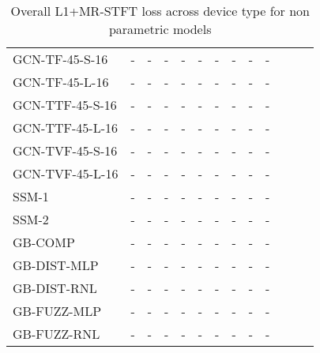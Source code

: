 \begin{table*}[h]
\begin{tabular}{lcccccccccccc}
        \midrule
        GCN-TF-45-S-16               
            & - & - & - & - & - & - & - & - & - \\
        GCN-TF-45-L-16               
            & - & - & - & - & - & - & - & - & - \\
        \midrule
        GCN-TTF-45-S-16               
            & - & - & - & - & - & - & - & - & - \\
        GCN-TTF-45-L-16               
            & - & - & - & - & - & - & - & - & - \\
        \midrule
        GCN-TVF-45-S-16               
            & - & - & - & - & - & - & - & - & - \\
        GCN-TVF-45-L-16               
            & - & - & - & - & - & - & - & - & - \\
        \midrule
        SSM-1               
            & - & - & - & - & - & - & - & - & - \\
        SSM-2               
            & - & - & - & - & - & - & - & - & - \\
        \midrule
        GB-COMP              
            & - & - & - & - & - & - & - & - & - \\
        \midrule
        GB-DIST-MLP             
            & - & - & - & - & - & - & - & - & - \\
        GB-DIST-RNL             
            & - & - & - & - & - & - & - & - & - \\
        \midrule
        GB-FUZZ-MLP             
            & - & - & - & - & - & - & - & - & - \\
        GB-FUZZ-RNL             
            & - & - & - & - & - & - & - & - & - \\
        \bottomrule 
    \end{tabular}
    \vspace{-0.0cm}
    \caption{Overall L1+MR-STFT loss across device type for non parametric models}
    \label{tab:other_fx} \vspace{0.2cm}
\end{table*}